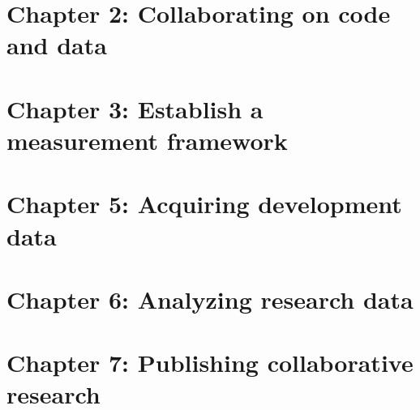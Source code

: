 \chapter{Chapter 2: Collaborating on code and data}
\label{ch:2}





\chapter{Chapter 3: Establish a measurement framework}
\label{ch:4}




\chapter{Chapter 5: Acquiring development data}
\label{ch:5}




\chapter{Chapter 6: Analyzing research data}
\label{ch:6}




\chapter{Chapter 7: Publishing collaborative research}
\label{ch:7}



